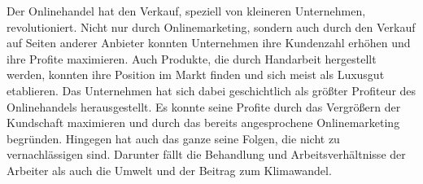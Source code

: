 Der Onlinehandel hat den Verkauf, speziell von kleineren Unternehmen, revolutioniert. Nicht nur durch Onlinemarketing, sondern auch durch den Verkauf auf Seiten anderer Anbieter konnten Unternehmen ihre Kundenzahl erhöhen und ihre Profite maximieren. Auch Produkte, die durch Handarbeit hergestellt werden, konnten ihre Position im Markt finden und sich meist als Luxusgut etablieren. Das Unternehmen hat sich dabei geschichtlich als größter Profiteur des Onlinehandels herausgestellt. Es konnte seine Profite durch das Vergrößern der Kundschaft maximieren und durch das bereits angesprochene Onlinemarketing begründen. Hingegen hat auch das ganze seine Folgen, die nicht zu vernachlässigen sind. Darunter fällt die Behandlung und Arbeitsverhältnisse der Arbeiter als auch die Umwelt und der Beitrag zum Klimawandel.
